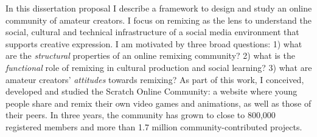 


\setcounter{savepage}{\thepage}
\begin{abstractpage}
\setlength{\parskip}{0pt} %
\begin{spacing}{1}
In this dissertation proposal I describe a framework to design and study an online community of amateur creators.
I focus on remixing as the lens to understand the social, cultural and technical infrastructure of a social media environment that supports creative expression.
I am motivated by three broad questions:
1) what are the \emph{structural} properties of an online remixing community?
2) what is the \emph{functional} role of remixing in cultural production and social learning?
3) what are amateur creators' \emph{attitudes} towards remixing?
As part of this work, I conceived, developed and studied the Scratch Online Community: a website where young people share and remix their own video games and animations, as well as those of their peers.
In three years, the community has grown to close to 800,000 registered members and more than 1.7 million community-contributed projects.
\end{spacing}
\setlength{\parskip}{11pt plus3pt minus3pt} %
\end{abstractpage}

